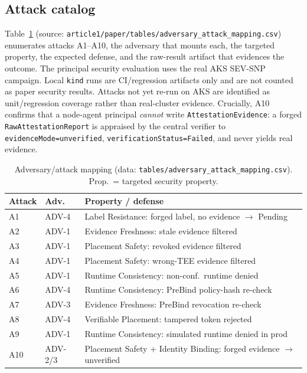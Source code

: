 \subsection{Attack catalog}
Table~\ref{tab:adversary} (source:
\texttt{article1/paper/tables/adversary\_attack\_mapping.csv}) enumerates
attacks A1--A10, the adversary that mounts each, the targeted property, the
expected defense, and the raw-result artifact that evidences the outcome.
The principal security evaluation uses the real AKS SEV-SNP campaign. Local
\texttt{kind} runs are CI/regression artifacts only and are not counted as paper
security results. Attacks not yet re-run on AKS are identified as unit/regression
coverage rather than real-cluster evidence.
Crucially, A10 confirms that a node-agent principal \emph{cannot} write
\texttt{AttestationEvidence}: a forged \texttt{RawAttestationReport} is appraised
by the central verifier to \texttt{evidenceMode=unverified},
\texttt{verificationStatus=Failed}, and never yields real evidence.

\begin{table}[t]
  \centering
  \caption{Adversary/attack mapping (data:
  \texttt{tables/adversary\_attack\_mapping.csv}). Prop.\ = targeted security
  property.}
  \label{tab:adversary}
  \footnotesize
  \begin{tabular}{@{}llp{3.4cm}@{}}
    \toprule
    \textbf{Attack} & \textbf{Adv.} & \textbf{Property / defense} \\
    \midrule
    A1 & ADV-4 & Label Resistance: forged label, no evidence $\to$ Pending \\
    A2 & ADV-1 & Evidence Freshness: stale evidence filtered \\
    A3 & ADV-1 & Placement Safety: revoked evidence filtered \\
    A4 & ADV-1 & Placement Safety: wrong-TEE evidence filtered \\
    A5 & ADV-1 & Runtime Consistency: non-conf.\ runtime denied \\
    A6 & ADV-4 & Runtime Consistency: PreBind policy-hash re-check \\
    A7 & ADV-3 & Evidence Freshness: PreBind revocation re-check \\
    A8 & ADV-4 & Verifiable Placement: tampered token rejected \\
    A9 & ADV-1 & Runtime Consistency: simulated runtime denied in prod \\
    A10 & ADV-2/3 & Placement Safety + Identity Binding: forged evidence $\to$ unverified \\
    \bottomrule
  \end{tabular}
\end{table}

